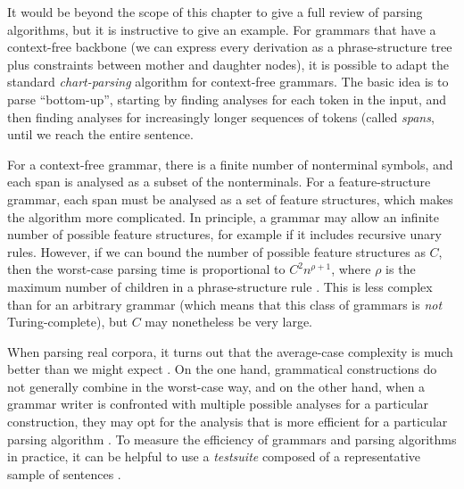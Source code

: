 \documentclass[output=paper,nonflat]{langsci/langscibook}
\begin{document}
It would be beyond the scope of this chapter
to give a full review of parsing algorithms,
but it is instructive to give an example.
For grammars that have a context-free backbone
(we can express every derivation as a phrase-structure tree
plus constraints between mother and daughter nodes),
it is possible to adapt the standard \textit{chart-parsing} algorithm for context-free grammars.
The basic idea is to parse ``bottom-up'',
starting by finding analyses for each token in the input,
and then finding analyses for increasingly longer sequences of tokens (called \textit{spans},
until we reach the entire sentence.

For a context-free grammar, there is a finite number of nonterminal symbols,
and each span is analysed as a subset of the nonterminals.
For a feature-structure grammar, each span must be analysed as a set of feature structures,
which makes the algorithm more complicated.
In principle, a grammar may allow an infinite number of possible feature structures,
for example if it includes recursive unary rules.
However, if we can bound the number of possible feature structures as $C$,
then the worst-case parsing time is proportional to $C^2 n^{\rho+1}$,
where $\rho$ is the maximum number of children in a phrase-structure rule
\citep[Section~3.2.3]{carroll1993parse}.
This is less complex than for an arbitrary grammar
(which means that this class of grammars is \emph{not} Turing-complete),
but $C$ may nonetheless be very large.

When parsing real corpora,
it turns out that the average-case complexity is much better than we might expect \citep{Carroll94}.
On the one hand, grammatical constructions do not generally combine in the worst-case way,
and on the other hand, when a grammar writer is confronted
with multiple possible analyses for a particular construction,
they may opt for the analysis that is more efficient for a particular parsing algorithm \citep{Flickinger2000a}.
To measure the efficiency of grammars and parsing algorithms in practice,
it can be helpful to use a \textit{testsuite} composed of a representative sample of sentences \citep{OF98}.

\end{document}
